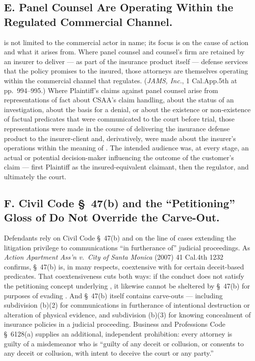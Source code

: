 \subsection*{E. Panel Counsel Are Operating Within the Regulated Commercial Channel.}

 is not limited to the commercial actor in name; its focus is on the cause of action and what it arises from. Where panel counsel and counsel's firm are retained by an insurer to deliver --- as part of the insurance product itself --- defense services that the policy promises to the insured, those attorneys are themselves operating within the commercial channel that  regulates. (\textit{JAMS, Inc.}, 1 Cal.App.5th at pp.\ 994--995.) Where Plaintiff's claims against panel counsel arise from representations of fact about CSAA's claim handling, about the status of an investigation, about the basis for a denial, or about the existence or non-existence of factual predicates that were communicated to the court before trial, those representations were made in the course of delivering the insurance defense product to the insurer-client and, derivatively, were made about the insurer's operations within the meaning of . The intended audience was, at every stage, an actual or potential decision-maker influencing the outcome of the customer's claim --- first Plaintiff as the insured-equivalent claimant, then the regulator, and ultimately the court.

\subsection*{F. Civil Code \S~47(b) and the ``Petitioning'' Gloss of  Do Not Override the Carve-Out.}

Defendants rely on Civil Code \S~47(b) and on the line of cases extending the litigation privilege to communications ``in furtherance of'' judicial proceedings. As \textit{Action Apartment Ass'n v.\ City of Santa Monica} (2007) 41 Cal.4th 1232 confirms, \S~47(b) is, in many respects, coextensive with  for certain deceit-based predicates. That coextensiveness cuts both ways: if the conduct does not satisfy the petitioning concept underlying , it likewise cannot be sheltered by \S~47(b) for purposes of evading . And \S~47(b) itself contains carve-outs --- including subdivision (b)(2) for communications in furtherance of intentional destruction or alteration of physical evidence, and subdivision (b)(3) for knowing concealment of insurance policies in a judicial proceeding. Business and Professions Code \S~6128(a) supplies an additional, independent prohibition: every attorney is guilty of a misdemeanor who is ``guilty of any deceit or collusion, or consents to any deceit or collusion, with intent to deceive the court or any party.''

